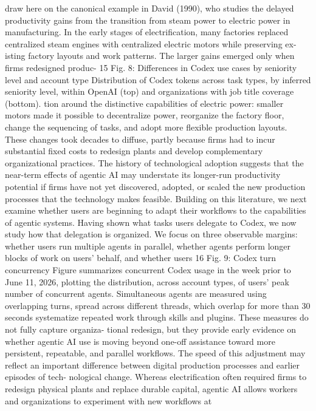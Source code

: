 draw here on the canonical example in David (1990), who studies the delayed productivity gains from
the transition from steam power to electric power in manufacturing. In the early stages of electrification,
many factories replaced centralized steam engines with centralized electric motors while preserving ex-
isting factory layouts and work patterns. The larger gains emerged only when firms redesigned produc-
15
Fig. 8: Differences in Codex use cases by seniority level and account type
Distribution of Codex tokens across task types, by inferred seniority level, within OpenAI (top) and organizations with job
title coverage (bottom).
tion around the distinctive capabilities of electric power: smaller motors made it possible to decentralize
power, reorganize the factory floor, change the sequencing of tasks, and adopt more flexible production
layouts. These changes took decades to diffuse, partly because firms had to incur substantial fixed costs
to redesign plants and develop complementary organizational practices. The history of technological
adoption suggests that the near-term effects of agentic AI may understate its longer-run productivity
potential if firms have not yet discovered, adopted, or scaled the new production processes that the
technology makes feasible.
Building on this literature, we next examine whether users are beginning to adapt their workflows
to the capabilities of agentic systems. Having shown what tasks users delegate to Codex, we now study
how that delegation is organized. We focus on three observable margins: whether users run multiple
agents in parallel, whether agents perform longer blocks of work on users’ behalf, and whether users
16
Fig. 9: Codex turn concurrency
Figure summarizes concurrent Codex usage in the week prior to June 11, 2026, plotting the distribution, across account types, of
users’ peak number of concurrent agents. Simultaneous agents are measured using overlapping turns, spread across different
threads, which overlap for more than 30 seconds
systematize repeated work through skills and plugins. These measures do not fully capture organiza-
tional redesign, but they provide early evidence on whether agentic AI use is moving beyond one-off
assistance toward more persistent, repeatable, and parallel workflows. The speed of this adjustment
may reflect an important difference between digital production processes and earlier episodes of tech-
nological change. Whereas electrification often required firms to redesign physical plants and replace
durable capital, agentic AI allows workers and organizations to experiment with new workflows at
